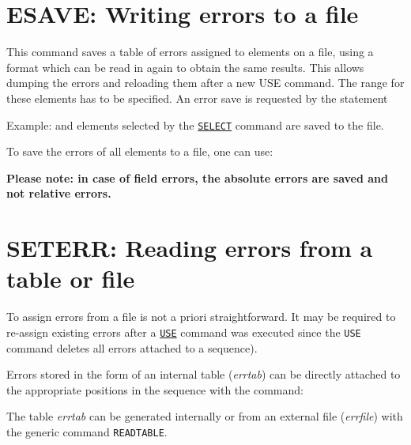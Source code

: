 
%

\section{ESAVE: Writing errors to a file}
\label{sec:esave}


This command saves a table of errors assigned to elements on a file,
using a format which can be read in again to obtain the same
results. This allows dumping the errors and reloading them after a new
USE command. The range for these elements has to be specified. An error
save is requested by the statement  

Example: 
and elements selected by the  \hyperref[sec:select]{\texttt{SELECT}}
command are saved to the file.  


To save the errors of all elements to a file, one can use: 

\textbf{Please note: in case of field errors, the absolute errors are
  saved and not relative errors. } 

\section{SETERR: Reading errors from a table or file}
\label{sec:seterr}

To assign errors from a file is not a priori straightforward. It may be
required to re-assign existing errors after a \hyperref[sec:use]{\texttt{USE}}
command was executed since the \texttt{USE} command deletes all errors attached to 
a sequence).

Errors stored in the form of an internal table (\textit{errtab}) can  be
directly attached to the appropriate positions in the sequence with the
command:  


The table \textit{errtab} can be generated internally or from an
external file (\textit{errfile}) with the generic command \texttt{READTABLE}.
 

